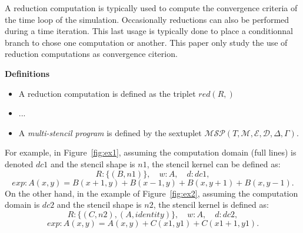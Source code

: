 A reduction computation is typically used to compute the convergence criteria of the time loop of the simulation. Occasionally reductions can also be performed during a time iteration. This last usage is typically done to place a conditionnal branch to chose one computation or another. This paper only study the use of reduction computations as convergence citerion.

\noindent \textbf{Definitions}
\begin{itemize}
\item A reduction computation is defined as the triplet $red(R,)$
\item ...
\item A \textit{multi-stencil program} is defined by the sextuplet $\mathcal{MSP}(T,\mathcal{M},\mathcal{E},\mathcal{D},\Delta,\Gamma)$.
\end{itemize}


For example, in Figure~\ref{fig:ex1}, assuming the computation domain (full lines) is denoted $dc1$ and the stencil shape is $n1$, the stencil kernel can be defined as:
\begin{equation*}
R: \{(B,n1)\}, \quad w: A, \quad d: dc1,
\end{equation*}
\begin{equation*}
exp: A(x,y)=B(x+1,y)+B(x-1,y)+B(x,y+1)+B(x,y-1).
\end{equation*}
On the other hand, in the example of Figure~\ref{fig:ex2}, assuming the computation domain is $dc2$ and the stencil shape is $n2$, the stencil kernel is defined as:
\begin{equation*}
R: \{(C,n2),(A,identity)\}, \quad w: A, \quad d: dc2,
\end{equation*}
\begin{equation*}
exp: A(x,y)=A(x,y)+C(x1,y1)+C(x1+1,y1).
\end{equation*}

